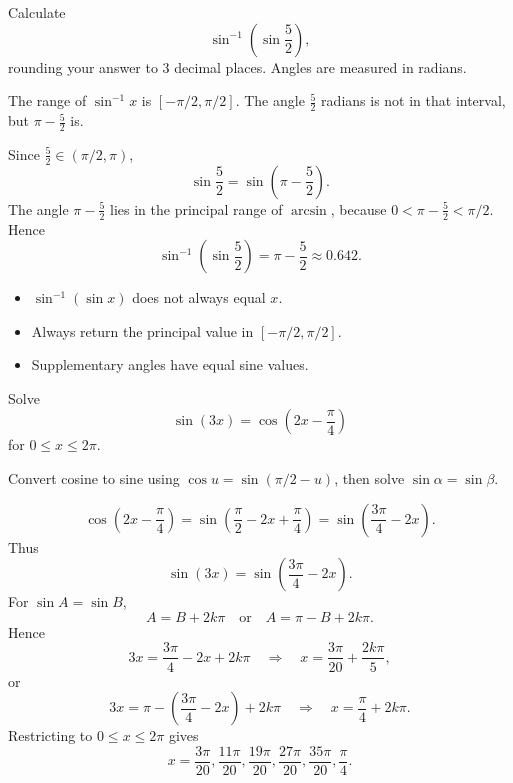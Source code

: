 
\begin{problem}
Calculate
\[
\sin^{-1}\!\left(\sin\frac{5}{2}\right),
\]
rounding your answer to $3$ decimal places. Angles are measured in radians.
\end{problem}

\begin{hintbox}
The range of $\sin^{-1}x$ is $[-\pi/2,\pi/2]$. The angle $\frac{5}{2}$ radians
is not in that interval, but $\pi-\frac{5}{2}$ is.
\end{hintbox}

\begin{solution}
Since $\frac{5}{2}\in(\pi/2,\pi)$,
\[
\sin\frac{5}{2}=\sin\left(\pi-\frac{5}{2}\right).
\]
The angle $\pi-\frac{5}{2}$ lies in the principal range of $\arcsin$, because
$0<\pi-\frac{5}{2}<\pi/2$. Hence
\[
\sin^{-1}\!\left(\sin\frac{5}{2}\right)
=\pi-\frac{5}{2}
\approx 0.642.
\]
\end{solution}

\begin{takeaways}
\begin{itemize}[leftmargin=*]
  \item $\sin^{-1}(\sin x)$ does not always equal $x$.
  \item Always return the principal value in $[-\pi/2,\pi/2]$.
  \item Supplementary angles have equal sine values.
\end{itemize}
\end{takeaways}

\begin{problem}
Solve
\[
\sin(3x)=\cos\!\left(2x-\frac{\pi}{4}\right)
\]
for $0\le x\le 2\pi$.
\end{problem}

\begin{hintbox}
Convert cosine to sine using $\cos u=\sin(\pi/2-u)$, then solve
$\sin\alpha=\sin\beta$.
\end{hintbox}

\begin{solution}
\[
\cos\!\left(2x-\frac{\pi}{4}\right)
=
\sin\!\left(\frac{\pi}{2}-2x+\frac{\pi}{4}\right)
=
\sin\!\left(\frac{3\pi}{4}-2x\right).
\]
Thus
\[
\sin(3x)=\sin\!\left(\frac{3\pi}{4}-2x\right).
\]
For $\sin A=\sin B$,
\[
A=B+2k\pi
\quad\text{or}\quad
A=\pi-B+2k\pi.
\]
Hence
\[
3x=\frac{3\pi}{4}-2x+2k\pi
\quad\Longrightarrow\quad
x=\frac{3\pi}{20}+\frac{2k\pi}{5},
\]
or
\[
3x=\pi-\left(\frac{3\pi}{4}-2x\right)+2k\pi
\quad\Longrightarrow\quad
x=\frac{\pi}{4}+2k\pi.
\]
Restricting to $0\le x\le 2\pi$ gives
\[
x=
\frac{3\pi}{20},\frac{11\pi}{20},\frac{19\pi}{20},
\frac{27\pi}{20},\frac{35\pi}{20},\frac{\pi}{4}.
\]
\end{solution}

